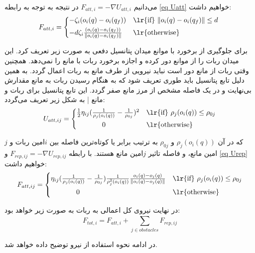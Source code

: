 می‌دانیم $F_{att,i} = -\nabla U_{att,i}$ در نتیجه به توجه به رابطه \ref{eq Uatt} خواهیم داشت:
\begin{equation}
F_{att,i} = 
\begin{cases*}
-\zeta_i(o_i(q) - o_i(q_f)) & \lr{if} $\|o_i(q) - o_i(q_f)\| \le d$ \\
-d\zeta_i \frac{(o_i(q) - o_i(q_f))}{\|o_i(q) - o_i(q_f)\|} & \lr{otherwise}
\end{cases*}
\end{equation}

برای جلوگیری از برخورد با موانع میدان پتانسیل دفعی به صورت زیر تعریف کرد. این میدان ربات را از موانع دور کرده و اجازه برخورد ربات با مانع را نمی‌دهد. همچنین وقتی ربات از مانع دور است نباید نیرویی از طرف مانع به ربات اعمال گردد. به همین دلیل تابع پتانسیل باید طوری تعریف شود که به هنگام رسیدن ربات به مانع مقدارش بی‌نهایت و در یک فاصله مشخص از مرز مانع صفر گردد. این تابع پتانسیل برای ربات  و مانع | به شکل زیر تعریف می‌گردد:
\begin{equation}\label{eq Urep}
U_{att,ij} = 
\begin{cases*}
\frac{1}{2}\eta_{ij}(\frac{1}{\rho_j(o_i(q))} - \frac{1}{\rho_{0j}})^2 & \lr{if} $\rho_j(o_i(q)) \le \rho_{0j}$\\
~~~~~~~~~~~0 & \lr{otherwise}
\end{cases*}
\end{equation}

که در آن $\rho_j(o_i(q))$ و $\rho_{0j}$ به ترتیب برابر یا کوتاه‌ترین فاصله بین $i$امین ربات و $j$امین مانع، و فاصله تاثیر $j$امین مانع هستند. با رابطه $F_{rep,ij} = -\nabla U_{rep,ij}$ و \ref{eq Urep} خواهیم داشت:
\begin{equation}\label{eq Frep}
F_{att,ij} = 
\begin{cases*}
\eta_{ij}(\frac{1}{\rho_j(o_i(q))} - \frac{1}{\rho_{0j}}) \frac{1}{\rho^2_j(o_i(q))} \frac{o_i(q)-o_j(q)}{\|o_i(q)-o_j(q)\|} & \lr{if} $\rho_j(o_i(q)) \le \rho_{0j}$\\
~~~~~~~~~~~0 & \lr{otherwise}
\end{cases*}
\end{equation}

در نهایت نیروی کل اعمالی به ربات به صورت زیر خواهد بود:
\begin{equation}\label{eq Ftot}
	F_{tot,i} = F_{att,i} + \sum_{j \in obstacles}^{}F_{rep,ij}
\end{equation}

در ادامه نحوه استفاده از نیرو توضیح داده خواهد شد.

